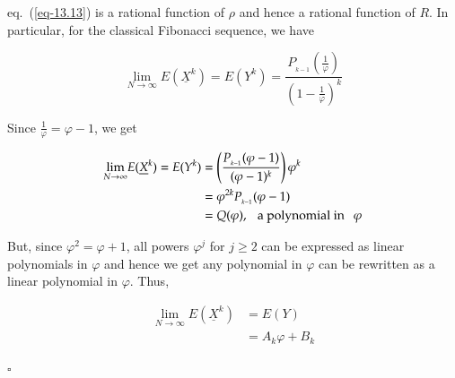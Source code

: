 \begin{multicols}{2}
\vspace{-.3cm}

eq.~(\ref{eq-13.13}) is a rational function of $\rho$ and hence a rational function of $R$. In particular, for the classical Fibonacci sequence, we have

\vspace{-.6cm}

\begin{equation}\nonumber
\displaystyle{\lim_{N \rightarrow \infty}} E(\underline{X}^k) = E(Y^k) = \frac{P_{_{k-1}}\left(\displaystyle{\frac{1}{\varphi}}\right)}{\left(1-\displaystyle{\frac{1}{\varphi}}\right)^k}
\end{equation}

\vspace{-.8cm}

Since $\displaystyle{\frac{1}{\varphi}} = \varphi-1$, we get

\vspace{-.8cm}
\begin{align}
\displaystyle{\lim_{N \rightarrow \infty}} E(\underline{X}^k) = E(Y^k) &= \left(\frac{P_{_{k-1}}(\varphi-1)}{(\varphi-1)^k}\right)\varphi^k\nonumber\\
&= \varphi^{2k} P_{_{k-1}}(\varphi-1)\nonumber\\
&= Q(\varphi), \hspace{0.1in}\textup{a polynomial in}\hspace{0.1in} \varphi \label{eq-13.14}
\end{align}

\vspace{-.6cm}

But, since $\varphi^2 = \varphi + 1$, all powers $\varphi^j$ for $j\ge2$ can be expressed as linear polynomials in $\varphi$ and hence we get any polynomial in $\varphi$ can be rewritten as a linear polynomial in $\varphi$. Thus,

\vspace{-.9cm}

\begin{align}
 \displaystyle{\lim_{N \rightarrow \infty}} E(\underline{X}^k) &= E(Y)\label{eq-13.15}\\
         &= A_k\varphi + B_k\label{eq-13.16}
\end{align}

\vspace{-.6cm}

\hfill{$\square$}

\vspace{-.5cm}


\end{multicols}
